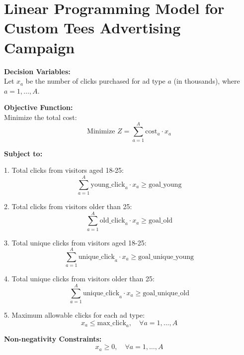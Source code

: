 \documentclass{article}
\begin{document}
\section*{Linear Programming Model for Custom Tees Advertising Campaign}

\textbf{Decision Variables:} \\
Let \( x_a \) be the number of clicks purchased for ad type \( a \) (in thousands), where \( a = 1, \ldots, A \).

\textbf{Objective Function:} \\
Minimize the total cost:
\[
\text{Minimize } Z = \sum_{a=1}^{A} \text{cost}_a \cdot x_a
\]

\textbf{Subject to:}

1. Total clicks from visitors aged 18-25:
\[
\sum_{a=1}^{A} \text{young\_click}_{a} \cdot x_a \geq \text{goal\_young}
\]

2. Total clicks from visitors older than 25:
\[
\sum_{a=1}^{A} \text{old\_click}_{a} \cdot x_a \geq \text{goal\_old}
\]

3. Total unique clicks from visitors aged 18-25:
\[
\sum_{a=1}^{A} \text{unique\_click}_{a} \cdot x_a \geq \text{goal\_unique\_young}
\]

4. Total unique clicks from visitors older than 25:
\[
\sum_{a=1}^{A} \text{unique\_click}_{a} \cdot x_a \geq \text{goal\_unique\_old}
\]

5. Maximum allowable clicks for each ad type:
\[
x_a \leq \text{max\_click}_{a}, \quad \forall a = 1, \ldots, A
\]

\textbf{Non-negativity Constraints:}
\[
x_a \geq 0, \quad \forall a = 1, \ldots, A
\]
\end{document}
